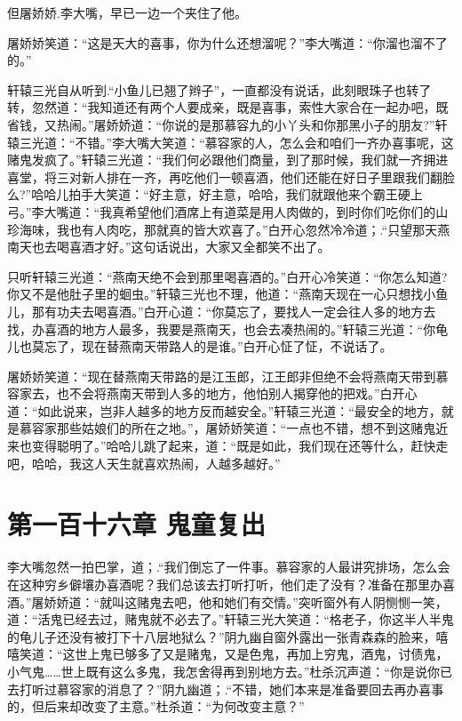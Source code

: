 \documentclass[12pt,oneside]{book}
\begin{document}
但屠娇娇.李大嘴，早已一边一个夹住了他。

屠娇娇笑道：``这是天大的喜事，你为什么还想溜呢？''李大嘴道：``你溜也溜不了的。''

轩辕三光自从听到.``小鱼儿已翘了辫子''，一直都没有说话，此刻眼珠子也转了转，忽然道：``我知道还有两个人要成亲，既是喜事，索性大家合在一起办吧，既省钱，又热闹。''屠娇娇道：``你说的是那慕容九的小丫头和你那黑小子的朋友?''轩辕三光道：``不错。''李大嘴大笑道：``慕容家的人，怎么会和咱们一齐办喜事呢，这赌鬼发疯了。''轩辕三光道：``我们何必跟他们商量，到了那时候，我们就一齐拥进喜堂，将三对新人排在一齐，再吃他们一顿喜酒，他们还能在好日子里跟我们翻脸么?''哈哈儿拍手大笑道：``好主意，好主意，哈哈，我们就跟他来个霸王硬上弓。''李大嘴道：``我真希望他们酒席上有道菜是用人肉做的，到时你们吃你们的山珍海味，我也有人肉吃，那就真的皆大欢喜了。''白开心忽然冷冷道；.``只望那天燕南天也去喝喜酒才好。''这句话说出，大家又全都笑不出了。

只听轩辕三光道：``燕南天绝不会到那里喝喜酒的。''白开心冷笑道：``你怎么知道?你又不是他肚子里的蛔虫。''轩辕三光也不理，他道：``燕南天现在一心只想找小鱼儿，那有功夫去喝喜酒。''白开心道：``你莫忘了，要找人一定会往人多的地方去找，办喜酒的地方人最多，我要是燕南天，也会去凑热闹的。''轩辕三光道：``你龟儿也莫忘了，现在替燕南天带路人的是谁。''白开心怔了怔，不说话了。

屠娇娇笑道：``现在替燕南天带路的是江玉郎，江王郎非但绝不会将燕南天带到慕容家去，也不会将燕南天带到人多的地方，他怕别人揭穿他的把戏。''白开心道：``如此说来，岂非人越多的地方反而越安全。''轩辕三光道：``最安全的地方，就是慕容家那些姑娘们的所在之地。''，屠娇娇笑道：``一点也不错，想不到这赌鬼近来也变得聪明了。''哈哈儿跳了起来，道：``既是如此，我们现在还等什么，赶快走吧，哈哈，我这人天生就喜欢热闹，人越多越好。''

\hypertarget{ux7b2cux4e00ux767eux5341ux516dux7ae0-ux9b3cux7ae5ux590dux51fa}{%
\chapter{第一百十六章
鬼童复出}\label{ux7b2cux4e00ux767eux5341ux516dux7ae0-ux9b3cux7ae5ux590dux51fa}}

李大嘴忽然一拍巴掌，道；.``我们倒忘了一件事。慕容家的人最讲究排场，怎么会在这种穷乡僻壤办喜酒呢？我们总该去打听打听，他们走了没有？准备在那里办喜酒。''屠娇娇道：``就叫这赌鬼去吧，他和她们有交情。''突听窗外有人阴恻恻一笑，道：``活鬼已经去过，赌鬼就不必去了。''轩辕三光大笑道：``格老子，你这半人半鬼的龟儿子还没有被打下十八层地狱么？''阴九幽自窗外露出一张青森森的脸来，嘻嘻笑道：``这世上鬼已够多了又是赌鬼，又是色鬼，再加上穷鬼，酒鬼，讨债鬼，小气鬼\ldots\ldots 世上既有这么多鬼，我怎舍得再到别地方去。''杜杀沉声道：``你是说你已去打听过慕容家的消息了？''阴九幽道；.``不错，她们本来是准备要回去再办喜事的，但后来却改变了主意。''杜杀道：``为何改变主意？''
\end{document}
